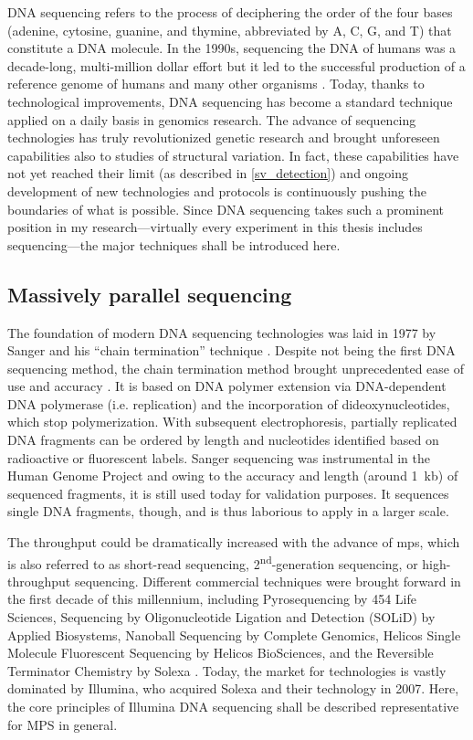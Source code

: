 DNA sequencing refers to the process of deciphering the order of the four bases
(adenine, cytosine, guanine, and thymine, abbreviated by A, C, G, and T) that
constitute a DNA molecule. In the 1990s, sequencing the DNA of humans was a
decade-long, multi-million dollar effort but it led to the successful production
of a reference genome of humans and many other organisms
\citep{Lander2001,Venter2001}. Today, thanks to technological improvements,
DNA sequencing has become a standard technique applied on a daily basis in
genomics research. The advance of sequencing technologies has truly
revolutionized genetic research and brought unforeseen capabilities also to
studies of structural variation. In fact, these capabilities have not yet
reached their limit (as described in \cref{sv_detection}) and ongoing
development of new technologies and protocols is continuously pushing the
boundaries of what is possible. Since DNA sequencing takes such a prominent
position in my research---virtually every experiment in this thesis includes
sequencing---the major techniques shall be introduced here.




\subsection{Massively parallel sequencing}
\label{sec:mps}

The foundation of modern DNA sequencing technologies was laid in 1977 by Sanger
and his ``chain termination'' technique \citep{Sanger1977}. Despite not being
the first DNA sequencing method, the chain termination method brought
unprecedented ease of use and accuracy \citep{Heather2016}. It is based on DNA
polymer extension via DNA-dependent DNA polymerase (i.e. replication) and the
incorporation of dideoxynucleotides, which stop polymerization. With subsequent
electrophoresis, partially replicated DNA fragments can be ordered by length and
nucleotides identified based on radioactive or fluorescent labels.
Sanger sequencing was instrumental in the Human Genome Project and owing to the
accuracy and length (around 1~kb) of sequenced fragments, it is still used
today for validation purposes. It sequences single DNA fragments, though, and
is thus laborious to apply in a larger scale.

The throughput could be dramatically increased with the advance of \acf{mps},
which is also referred to as short-read sequencing,
2\textsuperscript{nd}-generation sequencing, or high-throughput sequencing.
Different commercial techniques were brought forward in the first decade of this
millennium, including Pyrosequencing by 454 Life Sciences, Sequencing by
Oligonucleotide Ligation and Detection (SOLiD) by Applied Biosystems,
Nanoball Sequencing by Complete Genomics, Helicos Single Molecule Fluorescent
Sequencing by Helicos BioSciences, and the Reversible Terminator Chemistry by
Solexa \citep{wikiDNAseq2018}. Today, the market for \mps technologies is vastly
dominated by Illumina, who acquired Solexa and their technology in 2007. Here,
the core principles of Illumina DNA sequencing shall be described representative
for MPS in general.

